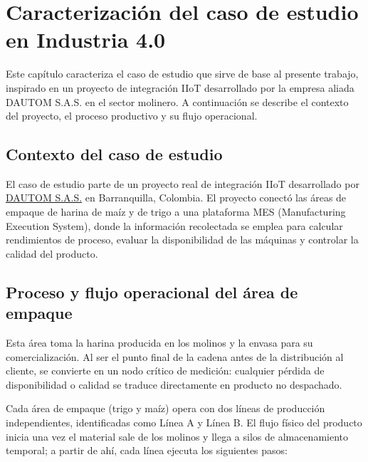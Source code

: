 \label{chap:capitulo1}
 


\section{Caracterización del caso de estudio en Industria 4.0}
\label{cap:caso_estudio}

Este capítulo caracteriza el caso de estudio que sirve de base al presente trabajo, inspirado en un proyecto de integración IIoT desarrollado por la empresa aliada DAUTOM S.A.S. en el sector molinero. A continuación se describe el contexto del proyecto, el proceso productivo y su flujo operacional.

\subsection{Contexto del caso de estudio}

El caso de estudio parte de un proyecto real de integración IIoT desarrollado por \href{https://www.dautom.com.co/}{DAUTOM S.A.S.} en Barranquilla, Colombia. El proyecto conectó las áreas de empaque de harina de maíz y de trigo a una plataforma MES (Manufacturing Execution System), donde la información recolectada se emplea para calcular rendimientos de proceso, evaluar la disponibilidad de las máquinas y controlar la calidad del producto.

\subsection{Proceso y flujo operacional del área de empaque}

Esta área toma la harina producida en los molinos y la envasa para su comercialización. Al ser el punto final de la cadena antes de la distribución al cliente, se convierte en un nodo crítico de medición: cualquier pérdida de disponibilidad o calidad se traduce directamente en producto no despachado.

Cada área de empaque (trigo y maíz) opera con dos líneas de producción independientes, identificadas como Línea A y Línea B. El flujo físico del producto inicia una vez el material sale de los molinos y llega a silos de almacenamiento temporal; a partir de ahí, cada línea ejecuta los siguientes pasos:

